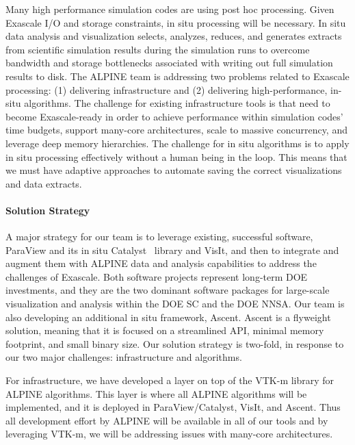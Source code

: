 Many high performance simulation codes are using post hoc processing.  
Given Exascale I/O and storage constraints, in situ processing will be necessary. 
In situ data analysis and visualization selects, analyzes, reduces, and generates extracts from scientific simulation results during the simulation runs to overcome bandwidth and storage bottlenecks associated with writing out full simulation results to disk. 
The ALPINE team is addressing two problems related to Exascale processing: (1) delivering infrastructure and (2) delivering high-performance, in-situ algorithms.
The challenge for existing infrastructure tools is that need to become Exascale-ready in order to achieve performance within simulation codes’ time budgets, support many-core architectures, scale to massive concurrency, and leverage deep memory hierarchies. The challenge for in situ algorithms is to apply in situ processing effectively without a human being in the loop.
This means that we must have adaptive approaches to automate saving the correct visualizations and data extracts.


\paragraph{Solution Strategy}

A major strategy for our team is to leverage existing, successful software, ParaView and its in situ Catalyst~\cite{Catalyst} library and VisIt, and then to integrate and augment them with ALPINE data and analysis capabilities to address the challenges of Exascale. 
%
Both software projects represent long-term DOE investments, and they are the two dominant software packages for large-scale visualization and analysis within the DOE SC and the DOE NNSA. 
%
Our team is also developing an additional  in situ framework, Ascent.  Ascent is a flyweight solution, meaning that it is focused on a streamlined API, minimal memory footprint, and small binary size.
Our solution strategy is two-fold, in response to our two major challenges: infrastructure and algorithms.

For infrastructure, we have developed a layer on top of the VTK-m library for ALPINE algorithms.
This layer is where all ALPINE algorithms will be implemented, and it is deployed in ParaView/Catalyst, VisIt, and Ascent.
Thus all development effort by ALPINE will be available in all of our tools and by leveraging VTK-m, we will be addressing issues with many-core architectures.  

